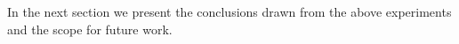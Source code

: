 In the next section we present the conclusions drawn from the above experiments and the scope for future work.















































































